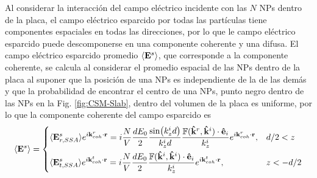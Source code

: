 Al considerar la interacción del campo eléctrico incidente con las $N$ NPs dentro de la placa, el campo eléctrico esparcido por todas las partículas tiene componentes espaciales en todas las direcciones, por lo que le campo eléctrico esparcido puede descomponerse en una componente coherente y una difusa. El  campo eléctrico esparcido promedio $\langle \vb{E}^s\rangle$, que corresponde a la componente coherente, se calcula al considerar el promedio espacial de las NPs dentro de la placa al suponer que la posición de una NPs es independiente de la de las demás y que la probabilidad de encontrar el centro de una NPs, punto negro dentro de las NPs en la Fig. \ref{fig:CSM-Slab},  dentro del volumen de la placa es uniforme, por lo que la componente coherente del campo esparcido es  \cite{garcia2012multiple} 
	\begin{align}
	\langle \vb{E}^s\rangle =
	\begin{dcases} 
	      \langle \vb{E}^s_{r,SSA}\rangle e^{i\vb{k}^r_{coh}\cdot\vb{r}} =
	    			i \frac{N}{V}  \frac{d E_0}{2} \frac{\sin(k_z^id)}{k_z^i d} 
				\frac{\mathbb{F}(\vu{k}^r,\vu{k}^i)\cdot \vu{e}_i}{k_z^i }	e^{i\vb{k}^r_{coh}\cdot\vb{r}},									& d/2<z \\
      \langle \vb{E}^s_{t,SSA}\rangle e^{i\vb{k}^t_{coh}\cdot\vb{r}} =
 				i\frac{N}{V} \frac{d E_0}{2}\frac{\mathbb{F}(\vu{k}^i,\vu{k}^i)\cdot \vu{e}_i}{k_z^i}		
				e^{i\vb{k}^t_{coh}\cdot\vb{r}},
							& z<-d/2
   \end{dcases}
   	\label{eq:AvErEt}
	\end{align}
